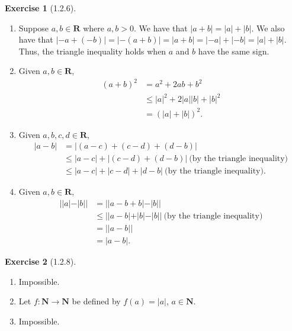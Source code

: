 \documentclass{amsart}
\theoremstyle{definition}
\newtheorem{exercise}{Exercise}
\newcommand{\N}{\mathbf{N}}
\newcommand{\R}{\mathbf{R}}
\newcommand{\abs}[1]{|#1|}
\begin{document}
\begin{exercise}[1.2.6]
  \begin{enumerate}[label={(\alph*)}]
    \item Suppose $a, b \in \R$ where $a, b > 0$. We have that $\abs{a + b} =
      \abs{a} + \abs{b}$.  We also have that $\abs{-a + (-b)} = \abs{-(a + b)} =
      \abs{a + b} = \abs{-a} + \abs{-b} = \abs{a} + \abs{b}$. Thus, the triangle
      inequality holds when $a$ and $b$ have the same sign.
    \item Given $a, b \in \R$,
      \begin{align*}
        {(a + b)}^2 &= a^2 + 2ab + b^2 \\
        &\le \abs{a}^2 + 2\abs{a}\abs{b} + \abs{b}^2 \\
        &= {(\abs{a} + \abs{b})}^2.
      \end{align*}
    \item Given $a, b, c, d \in \R$,
      \begin{align*}
        \abs{a - b} &= \abs{(a - c) + (c - d) + (d - b)} \\
        &\le \abs{a - c} + \abs{(c - d) + (d - b)}\ \text{(by the triangle
        inequality)} \\
        &\le \abs{a - c} + \abs{c - d} + \abs{d - b}\ \text{(by the triangle
        inequality)}.
      \end{align*}
    \item Given $a, b \in \R$,
      \begin{align*}
        \abs{\abs{a} - \abs{b}} &= \abs{\abs{a - b + b} - \abs{b}} \\
        &\le \abs{\abs{a - b} + \abs{b} - \abs{b}}\ \text{(by the triangle
        inequality)} \\
        &= \abs{\abs{a - b}} \\
        &= \abs{a - b}.
      \end{align*}
  \end{enumerate}
\end{exercise}

\begin{exercise}[1.2.8]
  \begin{enumerate}[label={(\alph*)}]
    \item Impossible.
    \item Let $f : \N \rightarrow \N$ be defined by $f(a) = \abs{a}$, $a \in \N$.
    \item Impossible.
  \end{enumerate}
\end{exercise}
\end{document}
